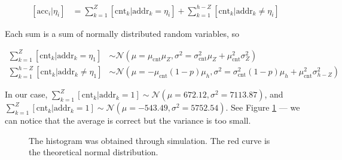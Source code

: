 \begin{align}
\left[ \text{acc}_i|\eta_i \right] &= \sum_{k=1}^{Z} \left[ \text{cnt}_k | \text{addr}_k=\eta_i \right] + \sum_{k=1}^{h-Z} \left[ \text{cnt}_k | \text{addr}_k \ne \eta_i \right]
\end{align}

Each sum is a sum of normally distributed random variables, so

\begin{align}
\sum_{k=1}^{Z} \left[ \text{cnt}_k | \text{addr}_k=\eta_1 \right] &\sim \mathcal{N}(\mu = \mu_\text{cnt} \mu_Z, \sigma^2 = \sigma_\text{cnt}^2 \mu_Z + \mu_\text{cnt}^2 \sigma^2_Z) \label{eqn:sdm-eta1-addr1} \\
\sum_{k=1}^{h-Z} \left[ \text{cnt}_k | \text{addr}_k \ne \eta_1 \right] &\sim \mathcal{N}(\mu = -\mu_\text{cnt} (1-p) \mu_h, \sigma^2 = \sigma^2_\text{cnt} (1-p) \mu_h + \mu_\text{cnt}^2 \sigma^2_{h-Z}) \label{eqn:sdm-eta1-addr0}
\end{align}

In our case, $\sum_{k=1}^{Z} \left[ \text{cnt}_k | \text{addr}_k=1 \right] \sim \mathcal{N}(\mu=672.12, \sigma^2=7113.87)$, and $\sum_{k=1}^{Z} \left[ \text{cnt}_k | \text{addr}_k=1 \right] \sim \mathcal{N}(\mu=-543.49, \sigma^2=5752.54)$. See Figure \ref{fig:sdm-read-sums} --- we can notice that the average is correct but the variance is too small.

\begin{figure}[h!]
  \centering

  \caption{The histogram was obtained through simulation. The red curve is the theoretical normal distribution.}
  \label{fig:sdm-read-sums}
\end{figure}

